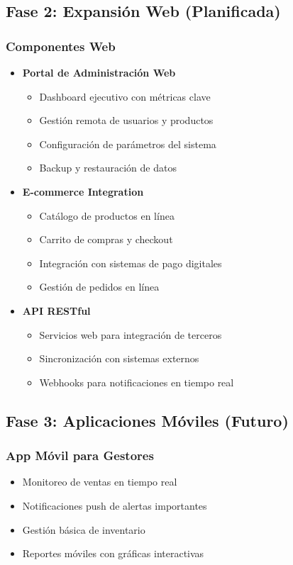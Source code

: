 \documentclass[12pt,letterpaper]{article}
\begin{document}
\subsection{Fase 2: Expansión Web (Planificada)}

\subsubsection{Componentes Web}
\begin{itemize}
    \item \textbf{Portal de Administración Web}
    \begin{itemize}
        \item Dashboard ejecutivo con métricas clave
        \item Gestión remota de usuarios y productos
        \item Configuración de parámetros del sistema
        \item Backup y restauración de datos
    \end{itemize}
    
    \item \textbf{E-commerce Integration}
    \begin{itemize}
        \item Catálogo de productos en línea
        \item Carrito de compras y checkout
        \item Integración con sistemas de pago digitales
        \item Gestión de pedidos en línea
    \end{itemize}
    
    \item \textbf{API RESTful}
    \begin{itemize}
        \item Servicios web para integración de terceros
        \item Sincronización con sistemas externos
        \item Webhooks para notificaciones en tiempo real
    \end{itemize}
\end{itemize}

\subsection{Fase 3: Aplicaciones Móviles (Futuro)}

\subsubsection{App Móvil para Gestores}
\begin{itemize}
    \item Monitoreo de ventas en tiempo real
    \item Notificaciones push de alertas importantes
    \item Gestión básica de inventario
    \item Reportes móviles con gráficas interactivas
\end{itemize}
\end{document}
